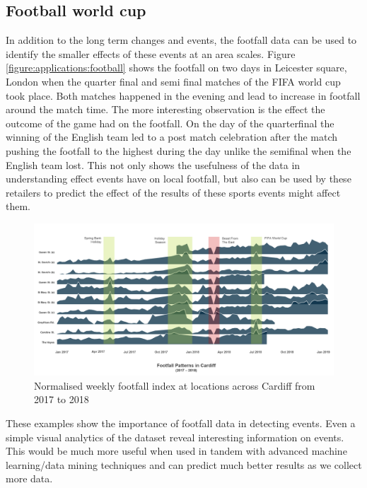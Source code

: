 \subsection{Football world cup}
In addition to the long term changes and events, the footfall data can be used to identify the smaller effects of these events at an area scales.
Figure \ref{figure:applications:football} shows the footfall on two days in Leicester square, London when the quarter final and semi final matches of the FIFA world cup took place. Both matches happened in the evening and lead to increase in footfall around the match time.
The more interesting observation is the effect the outcome of the game had on the footfall.
On the day of the quarterfinal the winning of the English team led to a post match celebration after the match pushing the footfall to the highest during the day unlike the semifinal when the English team lost. 
This not only shows the usefulness of the data in understanding effect events have on local footfall, but also can be used by these retailers to predict the effect of the results of these sports events might affect them.

\begin{figure}
  \includegraphics[trim={0 50 0 0},clip]{images/applications-cardiff-footfall.png}
  \caption{Normalised weekly footfall index at locations across Cardiff from 2017 to 2018}
  \label{figure:applications:cardiff}
\end{figure}

These examples show the importance of footfall data in detecting events. Even a simple visual analytics of the dataset reveal interesting information on events. This would be much more useful when used in tandem with advanced machine learning/data mining techniques and can predict much better results as we collect more data.

